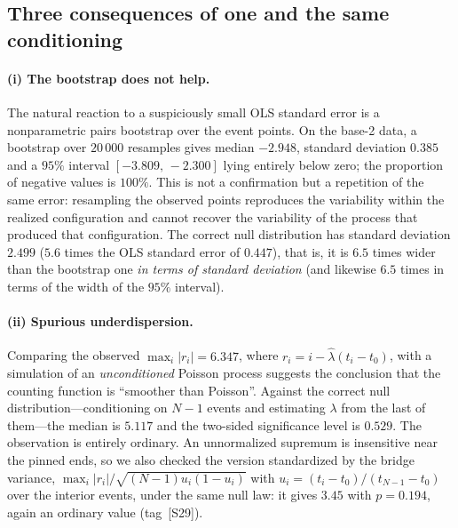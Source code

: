 \documentclass[11pt,a4paper]{article}
\theoremstyle{plain}
\theoremstyle{remark}
\begin{document}
\subsection{Three consequences of one and the same conditioning}

\paragraph{(i) The bootstrap does not help.} The natural reaction to a
suspiciously small OLS standard error is a nonparametric pairs bootstrap over the
event points. On
the base-2 data, a bootstrap over $20\,000$ resamples gives median $-2.948$,
standard deviation $0.385$ and a $95\%$ interval $[-3.809,\,-2.300]$ lying
entirely below zero; the proportion of negative values is $100\%$. This is not a
confirmation but a repetition of the same error: resampling the observed points
reproduces the variability within the realized configuration and cannot recover
the variability of the process that produced that configuration. The correct
null distribution has standard deviation $2.499$ ($5.6$ times the OLS standard
error of $0.447$), that is, it is $6.5$ times
wider than the bootstrap one \emph{in terms of standard deviation} (and likewise
$6.5$ times in terms of the width of the $95\%$ interval).

\paragraph{(ii) Spurious underdispersion.} Comparing the observed
$\max_i|r_i|=6.347$, where $r_i=i-\hat\lambda(t_i-t_0)$, with a simulation of an
\emph{unconditioned} Poisson process suggests the conclusion that the counting
function is ``smoother than Poisson''. Against the correct null
distribution---conditioning on $N-1$ events and estimating $\lambda$ from the
last of them---the median is $5.117$ and the two-sided significance level is
$0.529$. The observation is entirely ordinary. An unnormalized supremum is
insensitive near the pinned ends, so we also checked the version standardized by
the bridge variance, $\max_i|r_i|/\sqrt{(N-1)u_i(1-u_i)}$ with
$u_i=(t_i-t_0)/(t_{N-1}-t_0)$ over the interior events, under the same null law:
it gives $3.45$ with $p=0.194$, again an ordinary value (tag~[S29]).
\end{document}
